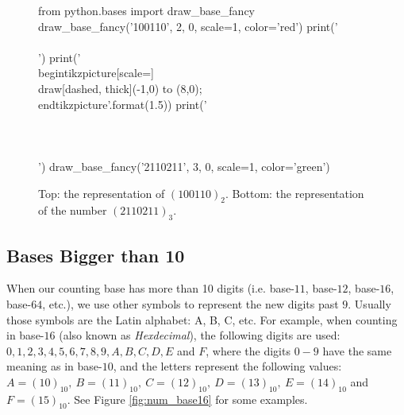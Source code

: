 \begin{figure}
  \centering
  \begin{pycode}
from python.bases import draw_base_fancy
draw_base_fancy('100110', 2, 0, scale=1, color='red')
print('\\\\')
print('\\begin{{tikzpicture}}[scale={}] \\draw[dashed, thick](-1,0) to (8,0); \\end{{tikzpicture}}'.format(1.5))
print('\\\\~\\\\')
draw_base_fancy('2110211', 3, 0, scale=1, color='green')
  \end{pycode}
  \label{fig:nums_in_bases_2_3}
  \caption[Graphical representation of two numbers in bases 2 and 3]{Top: the representation of $\left( 100110 \right)_{2}$. Bottom: the representation of the number $\left( 2110211 \right)_{3}$.}
\end{figure} 

\subsection{Bases Bigger than 10}
When our counting base has more than 10 digits (i.e. base-$11$, base-$12$, base-$16$, base-$64$, etc.), we use other symbols to represent the new digits past $9$. Usually those symbols are the Latin alphabet: A, B, C, etc. For example, when counting in base-$16$ (also known as \textit{Hexdecimal}), the following digits are used: $0,1,2,3,4,5,6,7,8,9,A,B,C,D,E$ and $F$, where the digits $0-9$ have the same meaning as in base-$10$, and the letters represent the following values: $A=\left( 10 \right)_{10},\ B=\left( 11 \right)_{10},\ C=\left( 12 \right)_{10},\ D=\left( 13 \right)_{10},\ E=\left( 14 \right)_{10}$ and $F=\left( 15 \right)_{10}$. See Figure \ref{fig:num_base16} for some examples. \par

